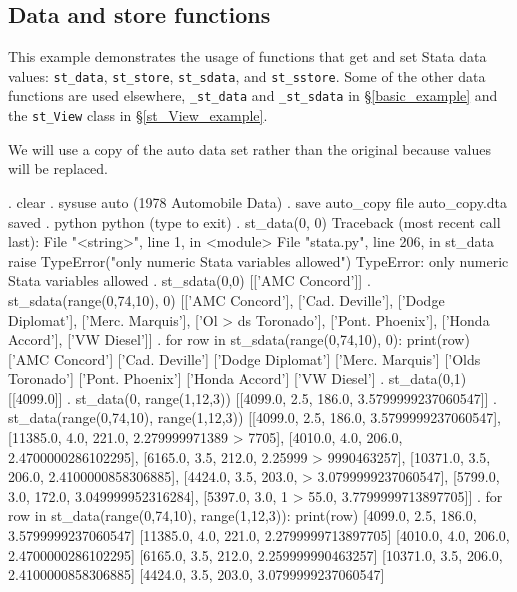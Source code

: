 \documentclass{article}
\begin{document}
\subsection{Data and store functions} \label{data_and_store_example}

This example demonstrates the usage of functions that get and set Stata data values: \lstinline$st_data$, \lstinline$st_store$, \lstinline$st_sdata$, and \lstinline$st_sstore$. Some of the other data functions are used elsewhere, \lstinline$_st_data$ and \lstinline$_st_sdata$ in \S\ref{basic_example} and the \lstinline$st_View$ class in \S\ref{st_View_example}.

We will use a copy of the auto data set rather than the original because values will be replaced.

\begin{stlog}
{\smallskip}
. clear
{\smallskip}
. sysuse auto
(1978 Automobile Data)
{\smallskip}
. save auto_copy
file auto_copy.dta saved
{\smallskip}
. python
 python (type {} to exit) 
. st_data(0, 0)
{\color{red}Traceback (most recent call last):
  File "<string>", line 1, in <module>
  File "stata.py", line 206, in st_data
    raise TypeError("only numeric Stata variables allowed")
TypeError: only numeric Stata variables allowed}
{\smallskip}
. st_sdata(0,0)
[['AMC Concord']]
{\smallskip}
. st_sdata(range(0,74,10), 0)
[['AMC Concord'], ['Cad. Deville'], ['Dodge Diplomat'], ['Merc. Marquis'], ['Ol
> ds Toronado'], ['Pont. Phoenix'], ['Honda Accord'], ['VW Diesel']]
{\smallskip}
. for row in st_sdata(range(0,74,10), 0): print(row)
['AMC Concord']
['Cad. Deville']
['Dodge Diplomat']
['Merc. Marquis']
['Olds Toronado']
['Pont. Phoenix']
['Honda Accord']
['VW Diesel']
{\smallskip}
. st_data(0,1)
[[4099.0]]
{\smallskip}
. st_data(0, range(1,12,3))
[[4099.0, 2.5, 186.0, 3.5799999237060547]]
{\smallskip}
. st_data(range(0,74,10), range(1,12,3))
[[4099.0, 2.5, 186.0, 3.5799999237060547], [11385.0, 4.0, 221.0, 2.279999971389
> 7705], [4010.0, 4.0, 206.0, 2.4700000286102295], [6165.0, 3.5, 212.0, 2.25999
> 9990463257], [10371.0, 3.5, 206.0, 2.4100000858306885], [4424.0, 3.5, 203.0, 
> 3.0799999237060547], [5799.0, 3.0, 172.0, 3.049999952316284], [5397.0, 3.0, 1
> 55.0, 3.7799999713897705]]
{\smallskip}
. for row in st_data(range(0,74,10), range(1,12,3)): print(row)
[4099.0, 2.5, 186.0, 3.5799999237060547]
[11385.0, 4.0, 221.0, 2.2799999713897705]
[4010.0, 4.0, 206.0, 2.4700000286102295]
[6165.0, 3.5, 212.0, 2.259999990463257]
[10371.0, 3.5, 206.0, 2.4100000858306885]
[4424.0, 3.5, 203.0, 3.0799999237060547]

\end{stlog}
\end{document}
